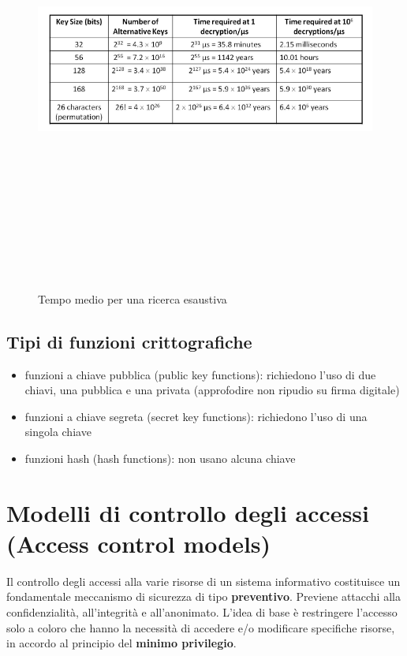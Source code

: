 \begin{figure}[htbp]
	\centering%
	\subfigure%
	{\includegraphics[height=14cm, width=16cm, keepaspectratio]{Immagini/Capitolo1/tab_tempi.png}}
	\caption{Tempo medio per una ricerca esaustiva \label{fig:tab_tempi}} 	
\end{figure}

\subsection{Tipi di funzioni crittografiche}
\begin{itemize} 
  \item funzioni a chiave pubblica (public key functions): richiedono l'uso di due chiavi, una pubblica e una privata (approfodire non ripudio su firma digitale)
  \item funzioni a chiave segreta (secret key functions): richiedono l'uso di una singola chiave
  \item funzioni hash (hash functions): non usano alcuna chiave 
\end{itemize}

\section{Modelli di controllo degli accessi (Access control models)}
Il controllo degli accessi alla varie risorse di un sistema informativo costituisce un fondamentale meccanismo di sicurezza di tipo \textbf{preventivo}. Previene attacchi alla confidenzialità, all'integrità e all'anonimato. L'idea di base è restringere l’accesso solo a coloro che hanno la necessità di accedere e/o modificare specifiche risorse, in accordo al principio del \textbf{minimo privilegio}.

